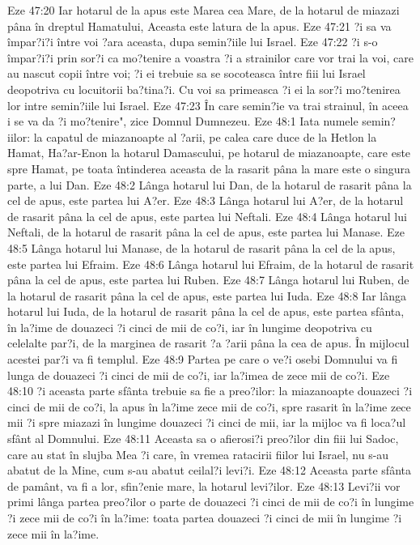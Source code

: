 Eze 47:20  Iar hotarul de la apus este Marea cea Mare, de la hotarul de miazazi pâna în dreptul Hamatului, Aceasta este latura de la apus.
Eze 47:21  ?i sa va împar?i?i între voi ?ara aceasta, dupa semin?iile lui Israel.
Eze 47:22  ?i s-o împar?i?i prin sor?i ca mo?tenire a voastra ?i a strainilor care vor trai la voi, care au nascut copii între voi; ?i ei trebuie sa se socoteasca între fiii lui Israel deopotriva cu locuitorii ba?tina?i. Cu voi sa primeasca ?i ei la sor?i mo?tenirea lor intre semin?iile lui Israel.
Eze 47:23  În care semin?ie va trai strainul, în aceea i se va da ?i mo?tenire", zice Domnul Dumnezeu.
Eze 48:1  Iata numele semin?iilor: la capatul de miazanoapte al ?arii, pe calea care duce de la Hetlon la Hamat, Ha?ar-Enon la hotarul Damascului, pe hotarul de miazanoapte, care este spre Hamat, pe toata întinderea aceasta de la rasarit pâna la mare este o singura parte, a lui Dan.
Eze 48:2  Lânga hotarul lui Dan, de la hotarul de rasarit pâna la cel de apus, este partea lui A?er.
Eze 48:3  Lânga hotarul lui A?er, de la hotarul de rasarit pâna la cel de apus, este partea lui Neftali.
Eze 48:4  Lânga hotarul lui Neftali, de la hotarul de rasarit pâna la cel de apus, este partea lui Manase.
Eze 48:5  Lânga hotarul lui Manase, de la hotarul de rasarit pâna la cel de la apus, este partea lui Efraim.
Eze 48:6  Lânga hotarul lui Efraim, de la hotarul de rasarit pâna la cel de apus, este partea lui Ruben.
Eze 48:7  Lânga hotarul lui Ruben, de la hotarul de rasarit pâna la cel de apus, este partea lui Iuda.
Eze 48:8  Iar lânga hotarul lui Iuda, de la hotarul de rasarit pâna la cel de apus, este partea sfânta, în la?ime de douazeci ?i cinci de mii de co?i, iar în lungime deopotriva cu celelalte par?i, de la marginea de rasarit ?a ?arii pâna la cea de apus. În mijlocul acestei par?i va fi templul.
Eze 48:9  Partea pe care o ve?i osebi Domnului va fi lunga de douazeci ?i cinci de mii de co?i, iar la?imea de zece mii de co?i.
Eze 48:10  ?i aceasta parte sfânta trebuie sa fie a preo?ilor: la miazanoapte douazeci ?i cinci de mii de co?i, la apus în la?ime zece mii de co?i, spre rasarit în la?ime zece mii ?i spre miazazi în lungime douazeci ?i cinci de mii, iar la mijloc va fi loca?ul sfânt al Domnului.
Eze 48:11  Aceasta sa o afierosi?i preo?ilor din fiii lui Sadoc, care au stat în slujba Mea ?i care, în vremea ratacirii fiilor lui Israel, nu s-au abatut de la Mine, cum s-au abatut ceilal?i levi?i.
Eze 48:12  Aceasta parte sfânta de pamânt, va fi a lor, sfin?enie mare, la hotarul levi?ilor.
Eze 48:13  Levi?ii vor primi lânga partea preo?ilor o parte de douazeci ?i cinci de mii de co?i în lungime ?i zece mii de co?i în la?ime: toata partea douazeci ?i cinci de mii în lungime ?i zece mii în la?ime.
